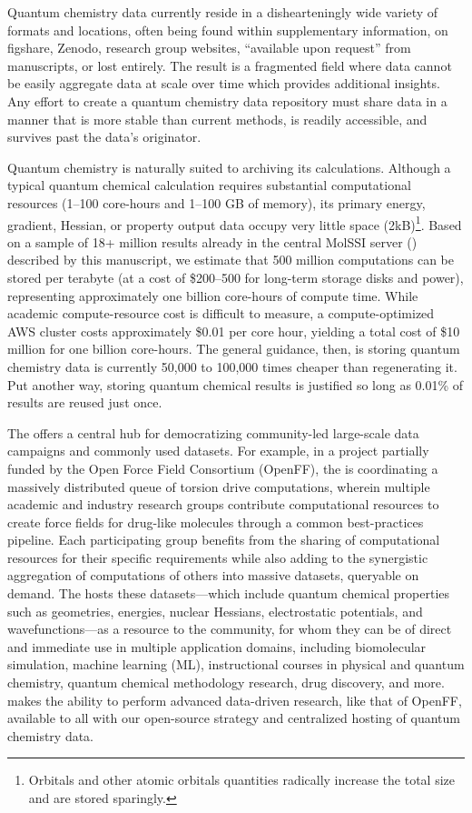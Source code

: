 \documentclass[journal=jctcce,manuscript=article]{achemso}
\newcommand{\textapprox}{\raisebox{0.5ex}{\texttildelow}}
\newcommand{\qcaN}{QCArchive}
\newcommand{\qca}{{\sc{\qcaN}}\xspace}%
\newcommand{\mqcas}{{\sc{mqcas}}\xspace}%
\begin{document}
Quantum chemistry data currently reside in a dishearteningly wide variety of formats and locations, often being found within supplementary information, on figshare\cite{WEB20:figshare}, Zenodo\cite{WEB20:zenodo}, research group websites, ``available upon request'' from manuscripts, or lost entirely. 
The result is a fragmented field where data cannot be easily aggregate data at scale over time which provides additional insights\cite{Milham2018}. 
Any effort to create a quantum chemistry data repository must share data in a manner that is more stable than current methods, is readily accessible, and survives past the data's originator.

Quantum chemistry is naturally suited to archiving its calculations.
Although a typical quantum chemical calculation requires substantial computational resources (\textapprox1--100 core-hours and \textapprox1--100 GB of memory), its primary energy, gradient, Hessian, or property output data occupy very little space (\textapprox2kB)\footnote{Orbitals and other atomic orbitals quantities radically increase the total size and are stored sparingly.}.
Based on a sample of 18+ million results already in the central MolSSI \qca server (\mqcas) described by this manuscript, we estimate that 500 million computations can be stored per terabyte (at a cost of \textapprox\$200--500 for long-term storage disks and power), representing approximately one billion core-hours of compute time.
While academic compute-resource cost is difficult to measure, a compute-optimized AWS cluster costs approximately \$0.01 per core hour, yielding a total cost of \textapprox\$10 million for one billion core-hours. 
The general guidance, then, is storing quantum chemistry data is currently 50,000 to 100,000 times cheaper than regenerating it.
Put another way, storing quantum chemical results is justified so long as 0.01\% of results are reused just once.

The \mqcas offers a central hub for democratizing community-led large-scale data campaigns and commonly used datasets. 
For example, in a project partially funded by the Open Force Field Consortium (OpenFF),\cite{MobleyOpenFF} the \mqcas is coordinating a massively distributed queue of torsion drive computations, wherein multiple academic and industry research groups contribute computational resources to create force fields for drug-like molecules through a common best-practices pipeline. 
Each participating group benefits from the sharing of computational resources for their specific requirements while also adding to the synergistic aggregation of computations of others into massive datasets, queryable on demand. 
The \mqcas hosts these datasets---which include quantum chemical properties such as geometries, energies, nuclear Hessians, electrostatic potentials, and wavefunctions---as a resource to the community, for whom they can be of direct and immediate use in multiple application domains, including biomolecular simulation, machine learning (ML), instructional courses in physical and quantum chemistry, quantum chemical methodology research, drug discovery, and more. 
\qca makes the ability to perform advanced data-driven research, like that of OpenFF, available to all with our open-source strategy and centralized hosting of quantum chemistry data.
\end{document}
